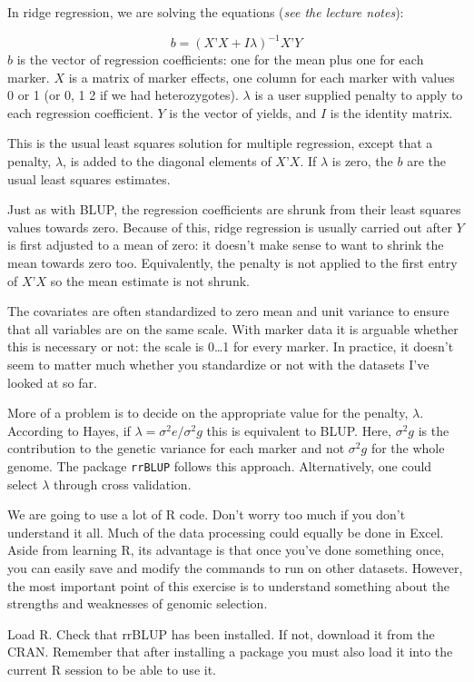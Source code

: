 \documentclass[
]{book}
\begin{document}
In ridge regression, we are solving the equations (\emph{see the lecture notes}):

\[b = (X’X+Iλ)^{-1} X’Y\]
\(b\) is the vector of regression coefficients: one for the mean plus one for each marker. \(X\) is a matrix of marker effects, one column for each marker with values 0 or 1 (or 0, 1 2 if we had heterozygotes). \(λ\) is a user supplied penalty to apply to each regression coefficient. \(Y\) is the vector of yields, and \(I\) is the identity matrix.

This is the usual least squares solution for multiple regression, except that a penalty, \(λ\), is added to the diagonal elements of \(X’X\). If \(λ\) is zero, the \(b\) are the usual least squares estimates.

Just as with BLUP, the regression coefficients are shrunk from their least squares values
towards zero. Because of this, ridge regression is usually carried out after \(Y\) is first adjusted to a mean of zero: it doesn't make sense to want to shrink the mean towards zero too. Equivalently, the penalty is not applied to the first entry of \(X’X\) so the mean estimate is not shrunk.

The covariates are often standardized to zero mean and unit variance to ensure that all
variables are on the same scale. With marker data it is arguable whether this is necessary or
not: the scale is 0\ldots1 for every marker. In practice, it doesn't seem to matter much whether you standardize or not with the datasets I've looked at so far.

More of a problem is to decide on the appropriate value for the penalty, \(λ\). According to
Hayes, if \(λ = σ^2e / σ^2g\) this is equivalent to BLUP. Here, \(σ^2g\) is the contribution to the genetic variance for each marker and not \(σ^2g\) for the whole genome. The package \texttt{rrBLUP} \citep{Endelman2011} follows this approach. Alternatively, one could select \(λ\) through cross validation.

We are going to use a lot of R code. Don't worry too much if you don't understand it all. Much of the data processing could equally be done in Excel. Aside from learning R, its advantage is that once you've done something once, you can easily save and modify the commands to run on other datasets. However, the most important point of this exercise is to understand something about the strengths and weaknesses of genomic selection.

Load R. Check that rrBLUP has been installed. If not, download it from the CRAN. Remember that after installing a package you must also load it into the current R session to be able to use it.
\end{document}
